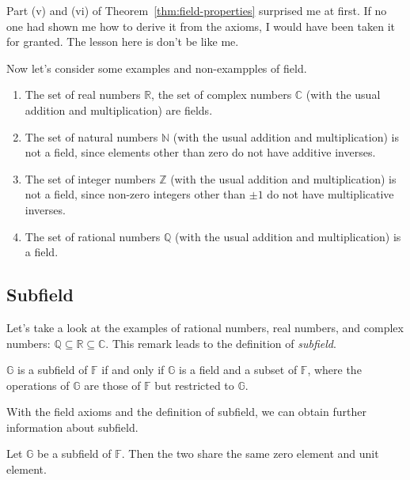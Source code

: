 \begin{note}
    Part (v) and (vi) of Theorem~\ref{thm:field-properties} surprised me at first. If no one had shown me how to derive it from the axioms, I would have been taken it for granted. The lesson here is don't be like me.
\end{note}

Now let's consider some examples and non-exampples of field.

\begin{example}
    \begin{enumerate}[label = (\alph*)]
        \item The set of real numbers $\mathbb{R}$, the set of complex numbers $\mathbb{C}$ (with the usual addition and multiplication) are fields.
        \item The set of natural numbers $\mathbb{N}$ (with the usual addition and multiplication) is not a field, since elements other than zero do not have additive inverses.
        \item The set of integer numbers $\mathbb{Z}$ (with the usual addition and multiplication) is not a field, since non-zero integers other than $\pm 1$ do not have multiplicative inverses.
        \item The set of rational numbers $\mathbb{Q}$ (with the usual addition and multiplication) is a field.
    \end{enumerate}
\end{example}

\subsection{Subfield}

Let's take a look at the examples of rational numbers, real numbers, and complex numbers: $\mathbb{Q}\subseteq\mathbb{R}\subseteq\mathbb{C}$. This remark leads to the definition of \textit{subfield}.

\begin{definition}[Subfield]
    $\mathbb{G}$ is a subfield of $\mathbb{F}$ if and only if $\mathbb{G}$ is a field and a subset of $\mathbb{F}$, where the operations of $\mathbb{G}$ are those of $\mathbb{F}$ but restricted to $\mathbb{G}$.
\end{definition}

With the field axioms and the definition of subfield, we can obtain further information about subfield.

\begin{theorem}
    Let $\mathbb{G}$ be a subfield of $\mathbb{F}$. Then the two share the same zero element and unit element.
\end{theorem}

